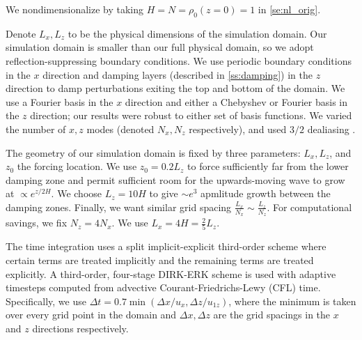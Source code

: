 \documentclass[
        fleqn,
        usenatbib,
    ]{mnras}
\begin{document}
We nondimensionalize by taking $H = N = \rho_0(z=0) = 1$ in
\autoref{se:nl_orig}.

Denote $L_x, L_z$ to be the physical dimensions of the simulation domain. Our
simulation domain is smaller than our full physical domain, so we adopt
reflection-suppressing boundary conditions. We use periodic boundary conditions
in the $x$ direction and damping layers (described in \autoref{ss:damping}) in
the $z$ direction to damp perturbations exiting the top and bottom of the
domain. We use a Fourier basis in the $x$ direction and either a Chebyshev or
Fourier basis in the $z$ direction; our results were robust to either set of
basis functions. We varied the number of $x, z$ modes (denoted $N_x, N_z$
respectively), and used $3/2$ dealiasing \citep{boyd}.

The geometry of our simulation domain is fixed by three parameters: $L_x, L_z$,
and $z_0$ the forcing location. We use $z_0 = 0.2L_z$ to force sufficiently far
from the lower damping zone and permit sufficient room for the upwards-moving
wave to grow at $\propto e^{z/2H}$. We choose $L_z = 10H$ to give $\sim e^3$
apmlitude growth between the damping zones. Finally, we want similar grid
spacing $\frac{L_x}{N_x} \sim \frac{L_z}{N_z}$. For computational savings, we
fix $N_z = 4N_x$. We use $L_x = 4H = \frac{2}{5}L_z$.

The time integration uses a split implicit-explicit third-order scheme where
certain terms are treated implicitly and the remaining terms are treated
explicitly. A third-order, four-stage DIRK-ERK scheme \citep{ascher} is used
with adaptive timesteps computed from advective Courant-Friedrichs-Lewy (CFL)
time. Specifically, we use $\Delta t = 0.7 \min(\Delta x / u_x,\Delta z / u_{1z})$,
where the minimum is taken over every grid point in the domain and $\Delta
x,\Delta z$ are the grid spacings in the $x$ and $z$ directions respectively.
\end{document}
